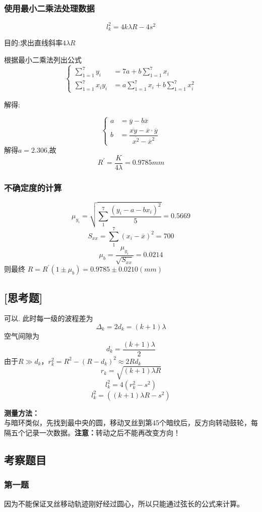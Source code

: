 \documentclass[12pt,a4paper,UTF8]{ctexart}
\begin{document}
\subsubsection*{使用最小二乘法处理数据}
\[
	l_k^2 = 4k\lambda R-4s^2
\]
\par 目的:求出直线斜率$4\lambda R$
\clearpage
\par 根据最小二乘法列出公式
$$\left\{
	\begin{aligned}
	\sum_{1=1}^{7} y_i &= 7a + b\sum_{1=1}^{7}x_i \\
	\sum_{1=1}^{7}x_iy_i & = a \sum_{1=1}^{7}x_i +b\sum_{1=1}^{7}x_i^2
	\end{aligned}
	\right.
$$
\par 解得:

$$\left\{
	\begin{aligned}
	a &= \overline{y}-b\overline{x} \\
	b & = \dfrac{\overline{xy}-\overline{x}\cdot\overline{y}}{\overline{x^2}-\overline{x}^2}
	\end{aligned}
	\right.
$$
解得$a = 2.306$,故
\[
	R^{\prime} = \frac{K}{4\lambda}=0.9785mm
\]
\subsubsection*{不确定度的计算}
\par 
\[
	\mu_{y_i} = \sqrt{\sum_{1}^{7}\frac{(y_i-a-bx_i)^2}{5}} = 0.5669
\]
\[
	S_{xx} = \sum_{1}^{7}(x_i-\overline{x})^2 = 700
\]
\[
	\mu_b = \frac{\mu_{y_i}}{\sqrt{S_{xx}}} = 0.0214
\]
则最终 $R = R^{\prime}(1\pm\mu_b) = 0.9785\pm 0.0210(mm)$
\subsection*{[思考题]}
\par 可以.
此时每一级的波程差为
\[
	\Delta_k = 2d_k = (k+1)\lambda
\]
空气间隙为
\[
	d_k = \frac{(k+1)\lambda}{2}
\]
由于$R\gg d_k$，$r_k^2 = R^2-(R-d_k)^2 \approx 2Rd_k$
$$
	r_k = \sqrt{(k+1)\lambda R}
$$
$$
	l_k^2 = 4(r_k^2-s^2)
$$
$$
	l_k^2 = ((k+1)\lambda R -s^2)
$$
\par \textbf{测量方法：}\\
与暗环类似，先找到最中央的圆，移动叉丝到第45个暗纹后，反方向转动鼓轮，每隔五个记录一次数据。\textbf{注意：}转动之后不能再改变方向！
\subsection*{考察题目}
\subsubsection*{第一题}
\par 因为不能保证叉丝移动轨迹刚好经过圆心，所以只能通过弦长的公式来计算。
\end{document}
